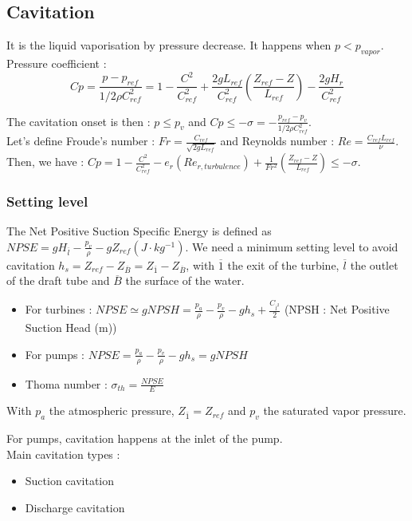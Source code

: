 \documentclass[../main.tex]{subfiles}
\begin{document}
\subsection{Cavitation}
It is the liquid vaporisation by pressure decrease. It happens when $p < p_{vapor}$.\\
Pressure coefficient :\begin{equation}
    Cp = \frac{p - p_{ref}}{1/2 \rho C_{ref}^2} = 1- \frac{C^2}{C_{ref}^2} + \frac{2 g L_{ref}}{C_{ref}^2}(\frac{Z_{ref} - Z}{L_{ref}}) - \frac{2g H_r}{C_{ref}^2}
\end{equation}

The cavitation onset is then : $p \leq p_v$ and $Cp \leq -\sigma = -\frac{p_{ref} - p_v}{1/2 \rho C_{ref}^2}$.\\

Let's define Froude's number : $Fr = \frac{C_{ref}}{\sqrt{2 g L_{ref}}}$ and Reynolds number : $Re = \frac{C_{ref} L_{ref}}{\nu}$. Then, we have : $Cp = 1 - \frac{C^2}{C_{ref}^2} - e_r (Re_{r,turbulence}) + \frac{1}{Fr^2} (\frac{Z_{ref}-Z}{L_{ref}}) \leq -\sigma$.\\

\subsubsection{Setting level}

The Net Positive Suction Specific Energy is defined as $NPSE = gH_{\overline{l}} - \frac{p_v}{\rho} - gZ_{ref} (J \cdot kg^{-1})$. We need a minimum setting level to avoid cavitation $h_s = Z_{ref} - Z_{\overline{B}} = Z_{\overline{1}} - Z_{\overline{B}}$, with $\overline{1}$ the exit of the turbine, $\overline{l}$ the outlet of the draft tube and $\overline{B}$ the surface of the water.\\
\begin{itemize}
    \item For turbines : $NPSE \simeq g NPSH = \frac{p_a}{\rho} - \frac{p_v}{\rho} - gh_s + \frac{C_{\overline{l}^2}}{2}$ (NPSH : Net Positive Suction Head (m))
    \item For pumps : $NPSE = \frac{p_a}{\rho} - \frac{p_v}{\rho} - gh_s = g NPSH$
    \item Thoma number : $\sigma_{th} = \frac{NPSE}{E}$
\end{itemize}
With $p_a$ the atmospheric pressure, $Z_{\overline{1}} = Z_{ref}$ and $p_v$ the saturated vapor pressure.

For pumps, cavitation happens at the inlet of the pump. \\
Main cavitation types : \begin{itemize}
    \item Suction cavitation
    \item Discharge cavitation
\end{itemize}
\end{document}

